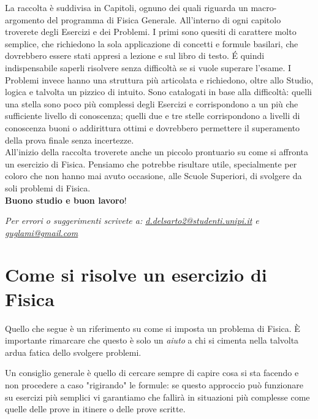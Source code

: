 \documentclass[12pt,a4paper]{book}
\begin{document}
La raccolta è suddivisa in Capitoli, ognuno dei quali riguarda un macro-argomento del programma di Fisica Generale. All'interno di ogni capitolo troverete degli Esercizi e dei Problemi. I primi sono quesiti di carattere molto semplice, che richiedono la sola applicazione di concetti e formule basilari, che dovrebbero essere stati  appresi a lezione e sul libro di testo. \'E quindi indispensabile saperli risolvere senza difficoltà se si vuole superare l'esame. I Problemi invece hanno una struttura più articolata e richiedono, oltre allo Studio, logica e talvolta un pizzico di intuito. Sono catalogati in base alla difficoltà: quelli una stella sono poco più complessi degli Esercizi e corrispondono a un più che sufficiente livello di conoscenza; quelli due e tre stelle corrispondono a livelli di conoscenza buoni o addirittura ottimi e dovrebbero permettere il superamento della prova finale senza incertezze. \\

All'inizio della raccolta troverete anche un piccolo prontuario su come si affronta un esercizio di Fisica. Pensiamo che potrebbe risultare utile, specialmente per coloro che non hanno mai avuto  occasione, alle Scuole Superiori, di svolgere da soli problemi di Fisica. \\

\textbf{Buono studio e buon lavoro}!

\textit{Per errori o suggerimenti scrivete a: \href{mailto:d.delsarto2@studenti.unipi.it}{d.delsarto2@studenti.unipi.it} e \href{mailto:guglami@gmail.com}{guglami@gmail.com}
}

\newpage

\section*{Come si risolve un esercizio di Fisica}

Quello che segue è un riferimento su come si imposta un problema di Fisica. È importante rimarcare che questo è solo un \textit{aiuto} a chi si cimenta nella talvolta ardua fatica dello svolgere problemi.

Un consiglio generale è quello di cercare sempre di capire cosa si sta facendo e non procedere a caso "rigirando" le formule: se questo approccio può funzionare su esercizi più semplici vi garantiamo che fallirà in situazioni più complesse come quelle delle prove in itinere o delle prove scritte.
\end{document}
